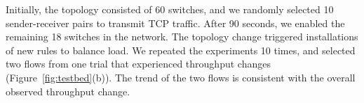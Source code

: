 {} 
Initially, the topology consisted of 60 switches, %
and we randomly selected 10 sender-receiver pairs to transmit TCP traffic. %
After 90 seconds, we enabled the remaining 18 switches in the network. 
The topology change triggered installations of new rules to balance load. %
We repeated the experiments 10 times, 
and selected two flows from one trial that experienced throughput changes
(Figure~\ref{fig:testbed}(b)). The trend of the two flows is consistent with the overall observed throughput change. %

